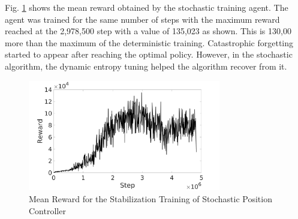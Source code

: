 Fig. \ref{stbrew} shows the mean reward obtained by the stochastic training agent. The agent was trained for the same number of steps with the maximum reward reached at the 2,978,500 step with a value of 135,023 as shown. This is 130,00 more than the maximum of the deterministic training. Catastrophic forgetting started to appear after reaching the optimal policy. However, in the stochastic algorithm, the dynamic entropy tuning helped the algorithm recover from it.
 \begin{figure}[H]
            \centering
            \includegraphics[width=0.75\textwidth]{plots/stab_rew.jpg}
            \caption{Mean Reward for the Stabilization Training of Stochastic Position Controller}
            \label{stbrew}
    \end{figure}
   
